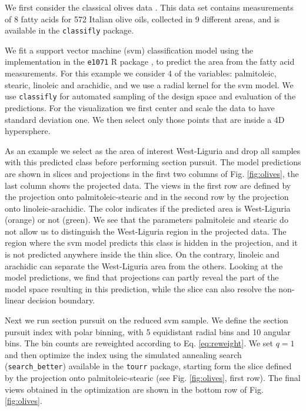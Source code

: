 \documentclass[]{interact}
\theoremstyle{plain}%
\theoremstyle{definition}
\theoremstyle{remark}
\begin{document}
We first consider the classical olives data \citep{olives}. This data
set contains measurements of 8 fatty acids for 572 Italian olive oils,
collected in 9 different areas, and is available in the
\texttt{classifly} package.

We fit a support vector machine (svm) classification model using the
implementation in the \texttt{e1071} R package \citep{e1071}, to predict
the area from the fatty acid measurements. For this example we consider
4 of the variables: palmitoleic, stearic, linoleic and arachidic, and we
use a radial kernel for the svm model. We use \texttt{classifly} for
automated sampling of the design space and evaluation of the
predictions. For the visualization we first center and scale the data to
have standard deviation one. We then select only those points that are
inside a 4D hypersphere.

As an example we select as the area of interest West-Liguria and drop
all samples with this predicted class before performing section pursuit.
The model predictions are shown in slices and projections in the first
two columns of Fig. \ref{fig:olives}, the last column shows the
projected data. The views in the first row are defined by the projection
onto palmitoleic-stearic and in the second row by the projection onto
linoleic-arachidic. The color indicates if the predicted area is
West-Liguria (orange) or not (green). We see that the parameters
palmitoleic and stearic do not allow us to distinguish the West-Liguria
region in the projected data. The region where the svm model predicts
this class is hidden in the projection, and it is not predicted anywhere
inside the thin slice. On the contrary, linoleic and arachidic can
separate the West-Liguria area from the others. Looking at the model
predictions, we find that projections can partly reveal the part of the
model space resulting in this prediction, while the slice can also
resolve the non-linear decision boundary.

Next we run section pursuit on the reduced svm sample. We define the
section pursuit index with polar binning, with 5 equidistant radial bins
and 10 angular bins. The bin counts are reweighted according to Eq.
\ref{eq:reweight}. We set \(q=1\) and then optimize the index using the
simulated annealing search (\texttt{search\_better}) available in the
\texttt{tourr} package, starting form the slice defined by the
projection onto palmitoleic-stearic (see Fig. \ref{fig:olives}, first
row). The final views obtained in the optimization are shown in the
bottom row of Fig. \ref{fig:olives}.
\end{document}
